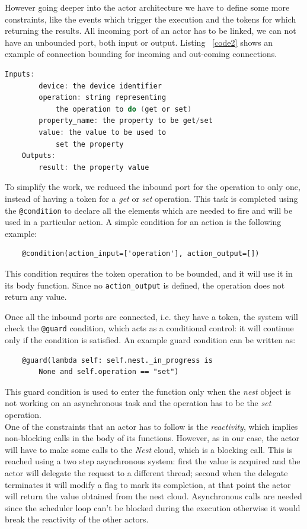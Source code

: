 However going deeper into the actor architecture we have to define some more constraints,
like the events which trigger the execution and the tokens for which returning the results.
All incoming port of an actor has to be linked, we can not have an unbounded port,
both input or output. Listing ~\ref{code2} shows an example of connection bounding for incoming
and out-coming connections.


\begin{lstlisting}[language=C,frame=single,caption=Example resource response,label=code2]
    Inputs:
        device: the device identifier
        operation: string representing
            the operation to do (get or set)
        property_name: the property to be get/set
        value: the value to be used to
            set the property
    Outputs:
        result: the property value
\end{lstlisting}

To simplify the work, we reduced the inbound port for the operation to only one, instead of having a token
for a \textit{get} or \textit{set} operation. This task is completed using the \texttt{@condition} to declare
all the elements which are needed to fire and will be used in a particular action.
A simple condition for an action is the following example:
\begin{verbatim}
    @condition(action_input=['operation'], action_output=[])
\end{verbatim}
This condition requires the token operation to be bounded, and it will use it in its body function. Since
no \texttt{action\_output} is defined, the operation does not return any value.

Once all the inbound ports are connected, i.e. they have a token, the system will check the \texttt{@guard} condition,
which acts as a conditional control: it will continue only if the condition is satisfied.
An example guard condition can be written as:

\begin{verbatim}
    @guard(lambda self: self.nest._in_progress is
        None and self.operation == "set")
\end{verbatim}
This guard condition is used to enter the function only when the \textit{nest} object is not
working on an asynchronous task and the operation has to be the \textit{set} operation.\\
One of the constraints that an actor has to follow is the \textit{reactivity}, which implies
non-blocking calls in the body of its functions. However, as in our case, the actor will have to
make some calls to the \textit{Nest} cloud, which is a blocking call. This is reached
using a two step asynchronous system: first the value is acquired and the actor
will delegate the request to a different thread; second when the delegate terminates it will
modify a flag to mark its completion, at that point the actor will return the value obtained
from the nest cloud. Asynchronous calls are needed since the scheduler loop can't be blocked
during the execution otherwise it would break the reactivity of the other actors.

